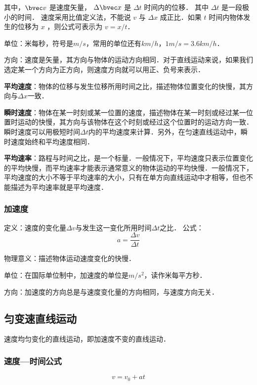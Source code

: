其中，$\bvec v$ 是速度矢量， $\Delta \bvec x$ 是 $\Delta t$ 时间内的位移． 其中 $\Delta t$ 是一段极小的时间． 速度采用比值定义法，不能说 $v$ 与 $\Delta x$ 成正比．如果 $t$ 时间内物体发生的位移为 $x$ ，则公式可表示为 $v=x/t$．

单位：米每秒，符号是$m/s$，常用的单位还有$km/h$，$1m/s=3.6km/h$．

方向：速度是矢量，其方向与物体的运动方向相同．对于直线运动来说，如果我们选定某一个方向为正方向，则速度方向就可以用正、负号来表示．

\textbf{平均速度}：物体的位移与发生位移所用时间之比，描述物体位置变化的快慢，其方向与$\Delta x$一致．

\textbf{瞬时速度}：物体在某一时刻或某一位置的速度，描述物体在某一时刻或经过某一位置时运动的快慢，其方向与该物体在这个时刻或经过这个位置时的运动方向一致．瞬时速度可以用极短时间$\Delta t$内的平均速度来计算．另外，在匀速直线运动中，瞬时速度始终和平均速度相同．

\textbf{平均速率}：路程与时间之比，是一个标量．一般情况下，平均速度只表示位置变化的平均快慢，而平均速率才能表示通常意义的物体运动的平均快慢．一般情况下，平均速度的大小不等于平均速率的大小，只有在单方向直线运动中才相等，但也不能描述为平均速率就是平均速度．

\subsubsection{加速度}
定义：速度的变化量$\Delta v$与发生这一变化所用时间$\Delta t$之比．
公式：
\begin{equation}
a=\frac{\Delta v}{\Delta t}
\end{equation}

物理意义：描述物体运动速度变化的快慢．

单位：在国际单位制中，加速度的单位是$m/s^2$，读作米每平方秒．

方向：加速度的方向总是与速度变化量的方向相同，与速度方向无关．

\subsection{匀变速直线运动}
速度均匀变化的直线运动，即加速度不变的直线运动．
\subsubsection{速度—时间公式}
\begin{equation}\label{HSPM01_eq1}
v=v_0+at
\end{equation}

